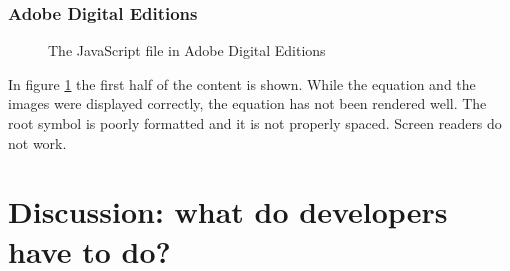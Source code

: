 \subsubsection{Adobe Digital Editions}
\begin{figure}[H]
	\centering
	\caption{The JavaScript file in Adobe Digital Editions}
	\label{fig:adobeDigital}
\end{figure}

In figure \ref{fig:adobeDigital} the first half of the content is shown. While the equation and the images were displayed correctly, the equation has not been rendered well. The root symbol is poorly formatted and it is not properly spaced. Screen readers do not work.

\section{Discussion: what do developers have to do?}


